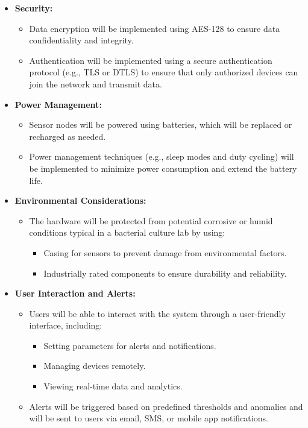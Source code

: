 \documentclass{article}
\begin{document}
\begin{enumerate}
\begin{itemize}
\item \textbf{Security:}

\begin{itemize}
    \item Data encryption will be implemented using AES-128 to ensure data confidentiality and integrity.
    \item Authentication will be implemented using a secure authentication protocol (e.g., TLS or DTLS) to ensure that only authorized devices can join the network and transmit data.
\end{itemize}

\item \textbf{Power Management:}
\begin{itemize} 
    \item Sensor nodes will be powered using batteries, which will be replaced or recharged as needed.
    \item Power management techniques (e.g., sleep modes and duty cycling) will be implemented to minimize power consumption and extend the battery life.
\end{itemize}

\item \textbf{Environmental Considerations:}

\begin{itemize} 
    \item The hardware will be protected from potential corrosive or humid conditions typical in a bacterial culture lab by using:
    \begin{itemize} 
        \item Casing for sensors to prevent damage from environmental factors.
        \item Industrially rated components to ensure durability and reliability.
    \end{itemize}
\end{itemize}

\item \textbf{User Interaction and Alerts:}

\begin{itemize}
    \item Users will be able to interact with the system through a user-friendly interface, including:
    \begin{itemize}
        \item Setting parameters for alerts and notifications.
        \item Managing devices remotely.
        \item Viewing real-time data and analytics.
    \end{itemize}
    \item Alerts will be triggered based on predefined thresholds and anomalies and will be sent to users via email, SMS, or mobile app notifications.
\end{itemize}


\end{itemize}
\end{enumerate}
\end{document}
